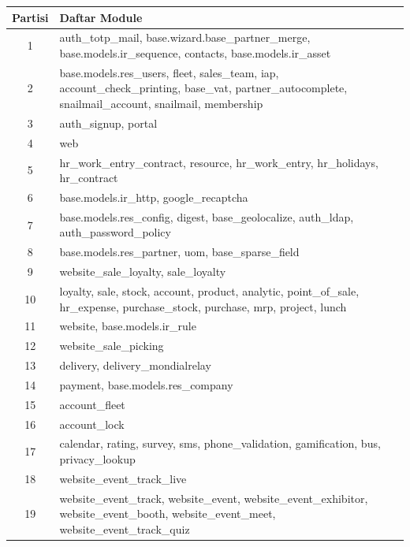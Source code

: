 \begingroup
\setlength{\LTleft}{-20cm plus -1fill}
\setlength{\LTright}{\LTleft}
\begin{small}
	\begin{longtable}{|c|p{14cm}|}
    \hline  
		\textbf{Partisi} & \textbf{Daftar Module}
		\\
		\endfirsthead
		\hline  
    1 & auth{\_}totp{\_}mail, base.wizard.base{\_}partner{\_}merge, base.models.ir{\_}sequence, contacts, base.models.ir{\_}asset \\ \hline
2 & base.models.res{\_}users, fleet, sales{\_}team, iap, account{\_}check{\_}printing, base{\_}vat, partner{\_}autocomplete, snailmail{\_}account, snailmail, membership \\ \hline
3 & auth{\_}signup, portal \\ \hline
4 & web \\ \hline
5 & hr{\_}work{\_}entry{\_}contract, resource, hr{\_}work{\_}entry, hr{\_}holidays, hr{\_}contract \\ \hline
6 & base.models.ir{\_}http, google{\_}recaptcha \\ \hline
7 & base.models.res{\_}config, digest, base{\_}geolocalize, auth{\_}ldap, auth{\_}password{\_}policy \\ \hline
8 & base.models.res{\_}partner, uom, base{\_}sparse{\_}field \\ \hline
9 & website{\_}sale{\_}loyalty, sale{\_}loyalty \\ \hline
10 & loyalty, sale, stock, account, product, analytic, point{\_}of{\_}sale, hr{\_}expense, purchase{\_}stock, purchase, mrp, project, lunch \\ \hline
11 & website, base.models.ir{\_}rule \\ \hline
12 & website{\_}sale{\_}picking \\ \hline
13 & delivery, delivery{\_}mondialrelay \\ \hline
14 & payment, base.models.res{\_}company \\ \hline
15 & account{\_}fleet \\ \hline
16 & account{\_}lock \\ \hline
17 & calendar, rating, survey, sms, phone{\_}validation, gamification, bus, privacy{\_}lookup \\ \hline
18 & website{\_}event{\_}track{\_}live \\ \hline
19 & website{\_}event{\_}track, website{\_}event, website{\_}event{\_}exhibitor, website{\_}event{\_}booth, website{\_}event{\_}meet, website{\_}event{\_}track{\_}quiz \\ \hline

\end{longtable}
\end{small}
